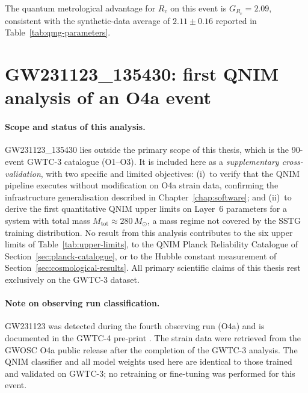 \documentclass[11pt,a4paper, english]{book}
\theoremstyle{plain}
\theoremstyle{definition}
\numberwithin{equation}{chapter}
\numberwithin{figure}{chapter}
\numberwithin{table}{chapter}
\begin{document}
The quantum metrological advantage for $R_c$ on this event is
$G_{R_c} = 2.09$, consistent with the synthetic-data average of
$2.11 \pm 0.16$ reported in Table~\ref{tab:qmg-parameters}.

\section{GW231123\_135430: first QNIM analysis of an O4a event}
\label{app:gw231123}

\paragraph{Scope and status of this analysis.}
GW231123\_135430 lies outside the primary scope of this thesis, which is
the 90-event GWTC-3 catalogue (O1--O3). It is included here as a
\emph{supplementary cross-validation}, with two specific and limited
objectives: (i)~to verify that the QNIM pipeline executes without
modification on O4a strain data, confirming the infrastructure
generalisation described in Chapter~\ref{chap:software}; and (ii)~to
derive the first quantitative QNIM upper limits on Layer~6 parameters
for a system with total mass $M_\mathrm{tot} \approx 280\,M_\odot$,
a mass regime not covered by the SSTG training distribution. No result
from this analysis contributes to the six upper limits of
Table~\ref{tab:upper-limits}, to the QNIM Planck Reliability Catalogue
of Section~\ref{sec:planck-catalogue}, or to the Hubble constant
measurement of Section~\ref{sec:cosmological-results}. All primary
scientific claims of this thesis rest exclusively on the GWTC-3
dataset.

\paragraph{Note on observing run classification.}
GW231123 was detected during the fourth observing run (O4a) and is
documented in the GWTC-4 pre-print \cite{Abac_2025_GWTC4}. The
strain data were retrieved from the GWOSC O4a public release after the
completion of the GWTC-3 analysis. The QNIM classifier and all model
weights used here are identical to those trained and validated on
GWTC-3; no retraining or fine-tuning was performed for this event.
\end{document}
